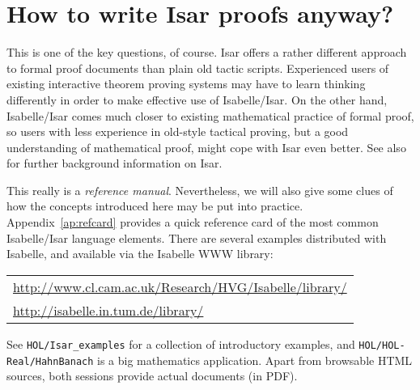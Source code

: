 \section{How to write Isar proofs anyway?}

This is one of the key questions, of course.  Isar offers a rather different
approach to formal proof documents than plain old tactic scripts.  Experienced
users of existing interactive theorem proving systems may have to learn
thinking differently in order to make effective use of Isabelle/Isar.  On the
other hand, Isabelle/Isar comes much closer to existing mathematical practice
of formal proof, so users with less experience in old-style tactical proving,
but a good understanding of mathematical proof, might cope with Isar even
better.  See also \cite{Wenzel:1999:TPHOL} for further background information
on Isar.

\medskip This really is a \emph{reference manual}.  Nevertheless, we will also
give some clues of how the concepts introduced here may be put into practice.
Appendix~\ref{ap:refcard} provides a quick reference card of the most common
Isabelle/Isar language elements.  There are several examples distributed with
Isabelle, and available via the Isabelle WWW library:
\begin{center}\small
  \begin{tabular}{l}
    \url{http://www.cl.cam.ac.uk/Research/HVG/Isabelle/library/} \\
    \url{http://isabelle.in.tum.de/library/} \\
  \end{tabular}
\end{center}

See \texttt{HOL/Isar_examples} for a collection of introductory examples, and
\texttt{HOL/HOL-Real/HahnBanach} is a big mathematics application.  Apart from
browsable HTML sources, both sessions provide actual documents (in PDF).

